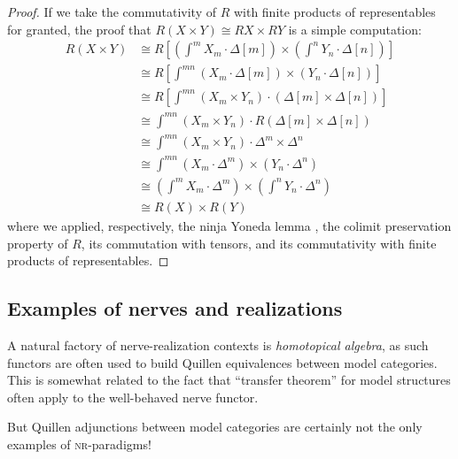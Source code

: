 \begin{proof}
If we take the commutativity of $R$ with finite products of representables for granted, the proof that $R(X\times Y)\cong RX\times RY$ is a simple computation:
\begin{align*}
R( X\times  Y) &\cong \textstyle R\left[ \left(\int^m X_m\cdot \Delta[m] \right )\times \left( \int^n Y_n\cdot \Delta[n]\right ) \right ]\\
&\cong\textstyle R\left[ \int^{mn} (X_m\cdot \Delta[m])\times (Y_n\cdot \Delta[n])\right]\\
&\cong\textstyle R\left[\int^{mn} (X_m\times Y_n)\cdot (\Delta[m]\times \Delta[n]) \right ]\\
&\cong\textstyle \int^{mn}(X_m\times Y_n)\cdot R(\Delta[m]\times \Delta[n])\\
&\cong\textstyle \int^{mn}(X_m\times Y_n)\cdot \Delta^m\times\Delta^n \\
&\cong\textstyle \int^{mn} (X_m\cdot\Delta^m)\times (Y_n\cdot \Delta^n)\\
&\cong\textstyle \left(\int^mX_m\cdot\Delta^m\right)\times \left(\int^n Y_n\cdot \Delta^n \right )\\
&\cong  R( X)\times R( Y)
\end{align*}
where we applied, respectively, the ninja Yoneda lemma , the colimit preservation property of $R$, its commutation with tensors, and its commutativity with finite products of representables.
\end{proof}
\subsection{Examples of nerves and realizations}
A natural factory of nerve\hyp{}realization contexts is \emph{homotopical algebra}, as such functors are often used to build Quillen equivalences between model categories. This is somewhat related to the fact that ``transfer theorem'' for model structures often apply to the well-behaved nerve functor.

But Quillen adjunctions between model categories are certainly not the only examples of \textsc{nr}-paradigms!

